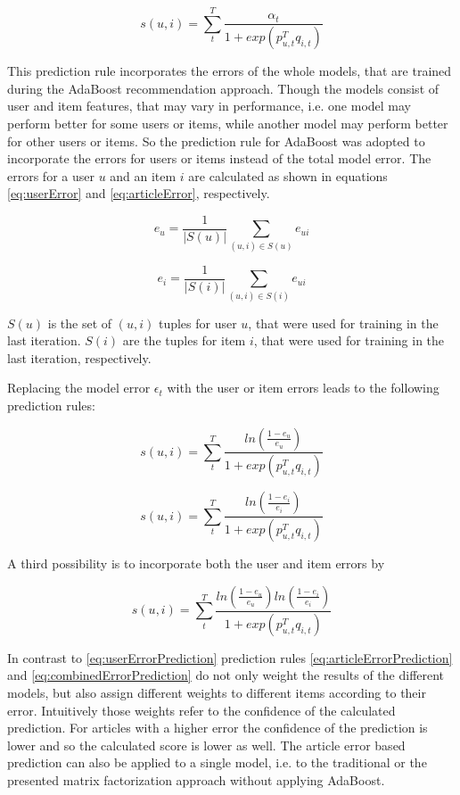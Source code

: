 \documentclass[10pt]{reportMaster}
\begin{document}
$$
s(u,i) = \sum_t^T{\frac{\alpha_t}{1 + exp(p_{u,t}^Tq_{i,t})}}
$$

This prediction rule incorporates the errors of the whole models, that are trained during the AdaBoost recommendation approach.
Though the models consist of user and item features, that may vary in performance, i.e. one model may perform better for some users or items, while another model may perform better for other users or items.
So the prediction rule for AdaBoost was adopted to incorporate the errors for users or items instead of the total model error.
The errors for a user $u$ and an item $i$ are calculated as shown in equations \ref{eq:userError} and \ref{eq:articleError}, respectively.

\begin{equation}
	\label{eq:userError}
	e_{u} = \frac{1}{|S(u)|} \sum_{(u,i) \in S(u)}{e_{ui}}
\end{equation}

\begin{equation}
	\label{eq:articleError}
	e_{i} = \frac{1}{|S(i)|} \sum_{(u,i) \in S(i)}{e_{ui}}
\end{equation}

$S(u)$ is the set of $(u,i)$ tuples for user $u$, that were used for training in the last iteration.
$S(i)$ are the tuples for item $i$, that were used for training in the last iteration, respectively.

Replacing the model error $\epsilon_t$ with the user or item errors leads to the following prediction rules:

\begin{equation}
\label{eq:userErrorPrediction}
	s(u,i) = \sum_t^T{\frac{ln(\frac{1 - e_u}{e_u})}{1 + exp(p_{u,t}^Tq_{i,t})}}
\end{equation}

\begin{equation}
\label{eq:articleErrorPrediction}
s(u,i) = \sum_t^T{\frac{ln(\frac{1 - e_i}{e_i})}{1 + exp(p_{u,t}^Tq_{i,t})}}
\end{equation}

A third possibility is to incorporate both the user and item errors by 

\begin{equation}
\label{eq:combinedErrorPrediction}
s(u,i) = \sum_t^T{\frac{ln(\frac{1 - e_u}{e_u})ln(\frac{1 - e_i}{e_i})}{1 + exp(p_{u,t}^Tq_{i,t})}}
\end{equation}

In contrast to \ref{eq:userErrorPrediction} prediction rules \ref{eq:articleErrorPrediction} and \ref{eq:combinedErrorPrediction} do not only weight the results of the different models, but also assign different weights to different items according to their error.
Intuitively those weights refer to the confidence of the calculated prediction.
For articles with a higher error the confidence of the prediction is lower and so the calculated score is lower as well.
The article error based prediction can also be applied to a single model, i.e. to the traditional or the presented matrix factorization approach without applying AdaBoost.
\end{document}
